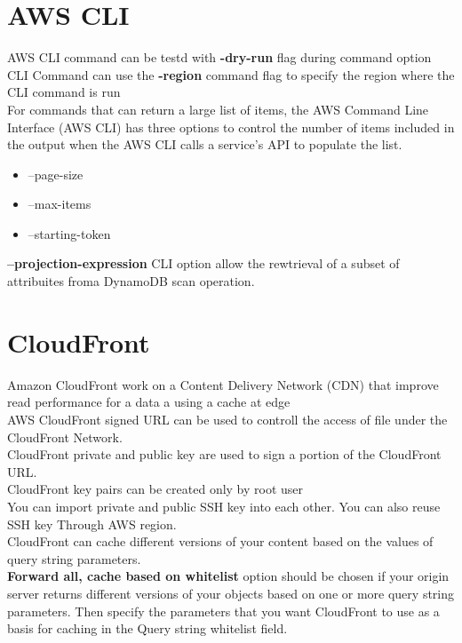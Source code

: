 \documentclass[12pt, letterpaper, twoside]{article}
\begin{document}
\section{AWS CLI}
AWS CLI command can be testd with \textbf{-\-dry-run} flag during command option\\
CLI Command can use the \textbf{-\-region} command flag to specify the region where the CLI command is run\\

For commands that can return a large list of items, the AWS Command Line Interface (AWS CLI) has three options to control the 
number of items included in the output when the AWS CLI calls a service's API to populate the list.
\begin{itemize}
	\item --page-size
	\item --max-items
	\item --starting-token
\end{itemize}

\textbf{--projection-expression} CLI option allow the rewtrieval of a subset of attribuites froma DynamoDB scan operation.\\

\section{CloudFront}
Amazon CloudFront work on a Content Delivery Network (CDN) that improve read performance for a data a using 
a cache at edge\\
AWS CloudFront signed URL can be used to controll the access of file under the CloudFront Network.\\
CloudFront private and public key are used to sign a portion of the CloudFront URL.\\
CloudFront key pairs can be created only by root user\\

You can import private and public SSH key into each other. You can also reuse SSH key
Through AWS region.\\

CloudFront can cache different versions of your content based on the values of query string parameters.\\
\textbf{Forward all, cache based on whitelist} option should be chosen if your origin server returns 
different versions of your objects based on one or more query string parameters.
Then specify the parameters that you want CloudFront to use as a basis for caching in the Query string whitelist field.\\
\end{document}
